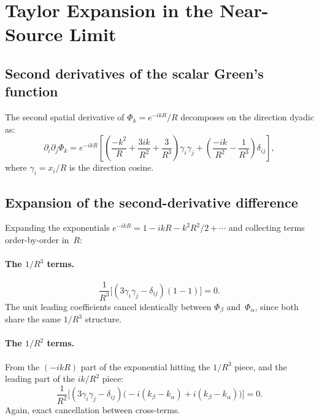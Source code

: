 \documentclass[11pt,a4paper]{article}
\begin{document}
\section{Taylor Expansion in the Near-Source Limit}

\subsection{Second derivatives of the scalar Green's function}

The second spatial derivative of $\Phi_k = e^{-ikR}/R$ decomposes on
the direction dyadic as:
\begin{equation}
  \partial_i\partial_j\Phi_k
  = e^{-ikR}\!\left[
      \left(\frac{-k^2}{R} + \frac{3ik}{R^2} + \frac{3}{R^3}\right)
      \gamma_i\gamma_j
      + \left(\frac{-ik}{R^2} - \frac{1}{R^3}\right)\delta_{ij}
    \right],
  \label{eq:d2phi}
\end{equation}
where $\gamma_i = x_i/R$ is the direction cosine.

\subsection{Expansion of the second-derivative difference}

Expanding the exponentials $e^{-ikR} = 1 - ikR - k^2R^2/2 + \cdots$
and collecting terms order-by-order in~$R$:

\paragraph{The \texorpdfstring{$1/R^3$}{1/R3} terms.}
\begin{equation}
  \frac{1}{R^3}\bigl[(3\gamma_i\gamma_j - \delta_{ij})(1-1)\bigr] = 0.
\end{equation}
The unit leading coefficients cancel identically between $\Phi_\beta$
and~$\Phi_\alpha$, since both share the same $1/R^3$ structure.

\paragraph{The \texorpdfstring{$1/R^2$}{1/R2} terms.}
From the $(-ikR)$ part of the exponential hitting the $1/R^3$ piece,
and the leading part of the $ik/R^2$ piece:
\begin{equation}
  \frac{1}{R^2}\bigl[
    (3\gamma_i\gamma_j - \delta_{ij})
    \bigl(-i(k_\beta - k_\alpha) + i(k_\beta - k_\alpha)\bigr)
  \bigr] = 0.
\end{equation}
Again, exact cancellation between cross-terms.
\end{document}
